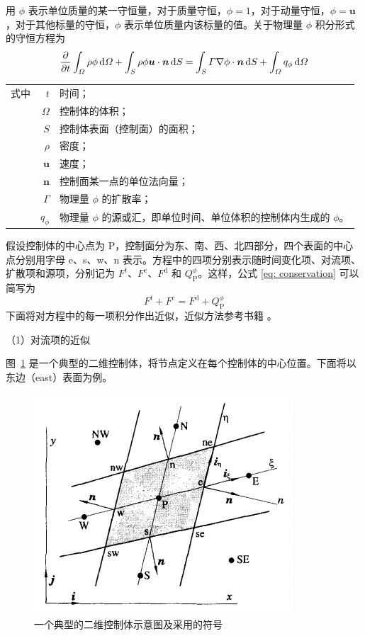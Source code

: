 用 $\phi$ 表示单位质量的某一守恒量，对于质量守恒，$\phi=1$，对于动量守恒，$\phi=\bm{u}$，对于其他标量的守恒，$\phi$ 表示单位质量内该标量的值。关于物理量 $\phi$ 积分形式的守恒方程为
\begin{equation}\label{eq: conservation}
	\frac{\partial}{\partial t}\int_{\varOmega}\rho\phi\,\mathrm{d}\varOmega +
	\int_S\rho\phi\bm{u}\cdot\bm{n}\,\mathrm{d} S =
	\int_S\varGamma\nabla\phi\cdot\bm{n}\,\mathrm{d} S +
	\int_{\varOmega}q_{\phi}\,\mathrm{d}\varOmega
\end{equation}
\begin{tabularx}{\textwidth}{@{}l@{\quad}r@{——}X@{}}
	式中 & $t$ & 时间；\\
		& $\varOmega$ & 控制体的体积；\\
		& $S$ & 控制体表面（控制面）的面积；\\
		& $\rho$ & 密度；\\
		& $\bm{u}$ & 速度；\\
		& $\bm{n}$ & 控制面某一点的单位法向量；\\
		& $\varGamma$ & 物理量 $\phi$ 的扩散率；\\
		& $q_{\phi}$ & 物理量 $\phi$ 的源或汇，即单位时间、单位体积的控制体内生成的 $\phi$。
\end{tabularx}\vspace{3.15bp}
假设控制体的中心点为 P，控制面分为东、南、西、北四部分，四个表面的中心点分别用字母 e、s、w、n 表示。方程中的四项分别表示随时间变化项、对流项、扩散项和源项，分别记为 $F^t$、$F^{\mathrm{c}}$、$F^{\mathrm{d}}$ 和 $Q_{\mathrm{P}}^{\phi}$。这样，公式 \eqref{eq: conservation} 可以简写为
\begin{equation}
	F^t + F^{\mathrm{c}} = F^{\mathrm{d}} + Q_{\mathrm{P}}^{\phi}
\end{equation}
下面将对方程中的每一项积分作出近似，近似方法参考书籍 。

（1）对流项的近似

图~\ref{fig: CV} 是一个典型的二维控制体，将节点定义在每个控制体的中心位置。下面将以东边（east）表面为例。

\begin{figure}
	\centering
	\includegraphics[scale=.6]{figs/CV}
	\caption{一个典型的二维控制体示意图及采用的符号 \cite[231]{Ferziger2002}}
	\label{fig: CV}
\end{figure}

